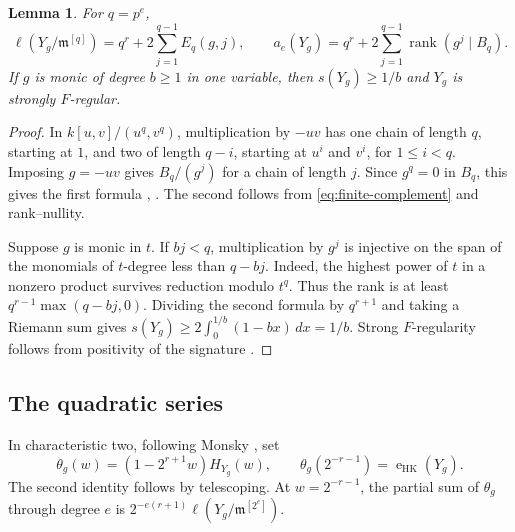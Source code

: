 \documentclass[11pt,a4paper,reqno]{amsart}
\numberwithin{equation}{section}
\theoremstyle{plain}
\newtheorem{lemma}[theorem]{Lemma}
\newcommand{\m}{\mathfrak m}
\newcommand{\eHK}{\operatorname{e}_{\mathrm{HK}}}
\DeclareMathOperator{\rk}{rank}
\begin{document}
\begin{lemma}\label{lem:boxsum}
For $q=p^e$,
\[
 \ell(Y_g/\m^{[q]})=q^r+2\sum_{j=1}^{q-1}E_q(g,j),\qquad
 a_e(Y_g)=q^r+2\sum_{j=1}^{q-1}\rk(g^j\mid B_q).
\]
If $g$ is monic of degree $b\ge1$ in one variable, then $s(Y_g)\ge1/b$ and $Y_g$ is strongly $F$-regular.
\end{lemma}
\begin{proof}
In $k[u,v]/(u^q,v^q)$, multiplication by $-uv$ has one chain of length $q$, starting at $1$, and two of length $q-i$, starting at $u^i$ and $v^i$, for $1\le i<q$. Imposing $g=-uv$ gives $B_q/(g^j)$ for a chain of length $j$. Since $g^q=0$ in $B_q$, this gives the first formula \cite[Theorem~2.2]{Mon08}, \cite[Lemma~2.4(1)]{ASS}. The second follows from \eqref{eq:finite-complement} and rank--nullity.

Suppose $g$ is monic in $t$. If $bj<q$, multiplication by $g^j$ is injective on the span of the monomials of $t$-degree less than $q-bj$. Indeed, the highest power of $t$ in a nonzero product survives reduction modulo $t^q$. Thus the rank is at least $q^{r-1}\max(q-bj,0)$. Dividing the second formula by $q^{r+1}$ and taking a Riemann sum gives $s(Y_g)\ge2\int_0^{1/b}(1-bx)\,dx=1/b$. Strong $F$-regularity follows from positivity of the signature \cite{AL03}.
\end{proof}

\subsection{The quadratic series}\label{sec:numbers}

In characteristic two, following Monsky \cite{Mtrans}, set
\begin{equation}\label{eq:theta-definition}
 \theta_g(w)=(1-2^{r+1}w)H_{Y_g}(w),\qquad
 \theta_g(2^{-r-1})=\eHK(Y_g).
\end{equation}
The second identity follows by telescoping. At $w=2^{-r-1}$, the partial sum of $\theta_g$ through degree $e$ is $2^{-e(r+1)}\ell(Y_g/\m^{[2^e]})$.
\end{document}
